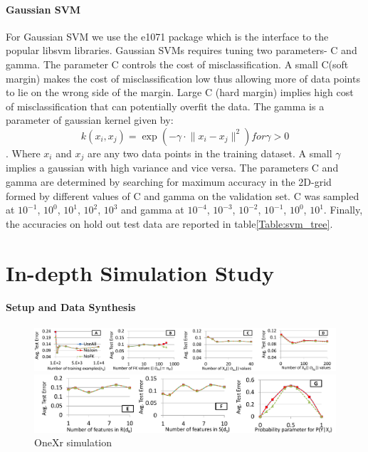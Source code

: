 \documentclass[sigconf]{acmart}
\begin{document}
\paragraph*{Gaussian SVM}
For Gaussian SVM we use the e1071 package which is the interface to the popular libsvm libraries. Gaussian SVMs requires tuning two parameters- C and gamma. The parameter C controls the cost of misclassification. A small C(soft margin) makes the cost of misclassification low thus allowing more of data points to lie on the wrong side of the margin. Large C (hard margin) implies high cost of misclassification that can potentially overfit the data. The gamma is a parameter of gaussian kernel given by: \[ k(x_i,x_j) = \exp(-\gamma \cdot \lVert{x_i - x_j} \rVert ^2 ) for \gamma > 0 \].
Where $x_{i}$ and $x_{j}$ are any two data points in the training dataset. A small $\gamma$ implies a gaussian with high variance and vice versa. The parameters C and gamma are determined by searching for maximum accuracy in the 2D-grid formed by different values of C and gamma on the validation set. C was sampled at $10^{-1}$, $10^{0}$, $10^{1}$, $10^{2}$, $10^{3}$ and gamma at $10^{-4}$, $10^{-3}$, $10^{-2}$, $10^{-1}$, $10^{0}$, $10^{1}$. Finally, the accuracies on hold out test data are reported in table\ref{Table:svm_tree}.

\section{In-depth Simulation Study}



\paragraph*{Setup and Data Synthesis}

\begin{figure}
\centering
\includegraphics[width=2\columnwidth,height=2\textheight,keepaspectratio]{onexr_row1.pdf}

\includegraphics[width=2\columnwidth,height=2\textheight,keepaspectratio]{onexr_row2.pdf}
\caption{OneXr simulation}
\label{Figure:OneXrSimulation}
\end{figure}
\end{document}
